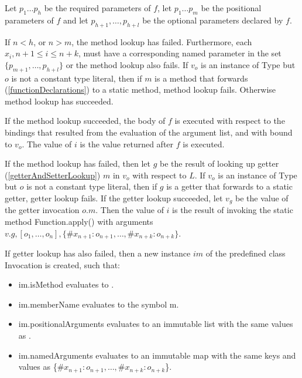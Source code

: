 \documentclass{article}
\newcommand{\code}[1]{{\sf #1}}
\begin{document}
\LMHash{}
Let $p_1 \ldots p_h$ be the required parameters of $f$,  let $p_1 \ldots p_m$ be the positional parameters of $f$ and let $p_{h+1}, \ldots, p_{h+l}$ be the optional parameters declared by $f$.


\LMHash{}
If  $n < h$, or $n > m$, the method lookup has failed. Furthermore, each $x_i, n+1 \le i \le n+k$,  must have a corresponding named parameter in the set $\{p_{m+1}, \ldots, p_{h+l}\}$ or the method lookup also fails.  If $v_o$ is an instance of \code{Type} but $o$ is not a constant type literal, then if $m$ is a method that forwards (\ref{functionDeclarations}) to a static method, method lookup fails. Otherwise method lookup has succeeded.

\LMHash{}
If the method lookup succeeded, the body of $f$ is executed with respect to the bindings that resulted from the evaluation of the argument list, and with \THIS{} bound to $v_o$. The value of $i$ is the value returned after $f$ is executed.

\LMHash{}
If the method lookup has failed, then let $g$ be the result of looking up getter (\ref{getterAndSetterLookup}) $m$ in $v_o$ with respect to $L$.
If $v_o$ is an instance of \code{Type} but $o$ is not a constant type literal, then if $g$ is a getter that forwards to a static getter, getter lookup fails.
If the getter lookup succeeded, let $v_g$ be the value of the getter invocation $o.m$. Then the value of $i$ is the result of invoking
the static method \code{Function.apply()} with arguments $v.g, [o_1, \ldots , o_n], \{\#x_{n+1}: o_{n+1}, \ldots , \#x_{n+k}: o_{n+k}\}$.

\LMHash{}
If getter lookup has also failed, then a new instance $im$ of the predefined class \code{Invocation} is created, such that:
\begin{itemize}
\item  \code{im.isMethod} evaluates to \code{\TRUE{}}.
\item  \code{im.memberName} evaluates to the symbol \code{m}.
\item \code{im.positionalArguments} evaluates to an immutable list with the same values as \code{[$o_1, \ldots, o_n$]}.
\item \code{im.namedArguments} evaluates to an immutable map with the same keys and values as \code{\{$\#x_{n+1}: o_{n+1}, \ldots, \#x_{n+k} : o_{n+k}$\}}.
\end{itemize}
\end{document}
